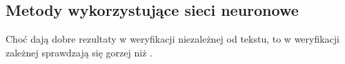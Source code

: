 \subsection{Metody wykorzystujące sieci neuronowe}




Choć  dają dobre rezultaty w weryfikacji niezależnej od tekstu, to w weryfikacji zależnej
sprawdzają się gorzej niż .


